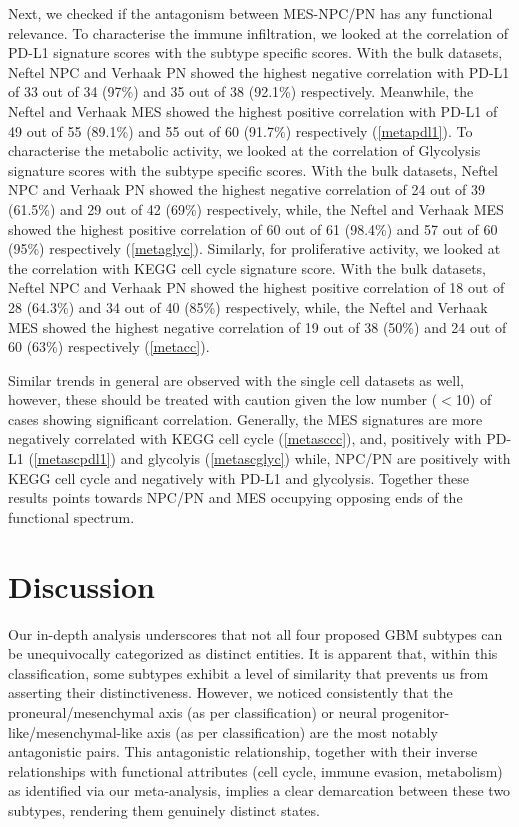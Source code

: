 \documentclass[11pt,a4paper]{article}
\begin{document}
Next, we checked if the antagonism between MES-NPC/PN has any functional relevance. To characterise the immune infiltration, we looked at the correlation of PD-L1 signature scores with the subtype specific scores. With the bulk datasets, Neftel NPC and Verhaak PN showed the highest negative correlation with PD-L1 of 33 out of 34 (97\%) and  35 out of 38 (92.1\%) respectively. Meanwhile, the Neftel and Verhaak MES showed the highest positive correlation with PD-L1 of 49 out of 55 (89.1\%) and 55 out of 60 (91.7\%) respectively (\autoref{metapdl1}). To characterise the metabolic activity, we looked at the correlation of Glycolysis signature scores with the subtype specific scores. With the bulk datasets, Neftel NPC and Verhaak PN showed the highest negative correlation of 24 out of 39 (61.5\%) and  29 out of 42 (69\%) respectively, while, the Neftel and Verhaak MES showed the highest positive correlation of 60 out of 61 (98.4\%) and 57 out of 60 (95\%) respectively (\autoref{metaglyc}). Similarly, for proliferative activity, we looked at the correlation with KEGG cell cycle signature score. With the bulk datasets, Neftel NPC and Verhaak PN showed the highest positive correlation of 18 out of 28 (64.3\%) and  34 out of 40 (85\%) respectively, while, the Neftel and Verhaak MES showed the highest negative correlation of 19 out of 38 (50\%) and 24 out of 60 (63\%) respectively (\autoref{metacc}).

Similar trends in general are observed with the single cell datasets as well, however, these should be treated with caution given the low number ($<$10) of cases showing significant correlation. Generally, the MES signatures are more negatively correlated with KEGG cell cycle (\autoref{metasccc}), and, positively with PD-L1 (\autoref{metascpdl1}) and glycolyis (\autoref{metascglyc}) while, NPC/PN are positively with KEGG cell cycle and negatively with PD-L1 and glycolysis. Together these results points towards NPC/PN and MES occupying opposing ends of the functional spectrum.

\section{Discussion}
Our in-depth analysis underscores that not all four proposed GBM subtypes can be unequivocally categorized as distinct entities. It is apparent that, within this classification, some subtypes exhibit a level of similarity that prevents us from asserting their distinctiveness. However, we noticed consistently that the proneural/mesenchymal axis (as per \cite{Verhaak} classification) or neural progenitor-like/mesenchymal-like axis (as per \cite{Neftel} classification) are the most notably antagonistic pairs. This antagonistic relationship, together with their inverse relationships with functional attributes (cell cycle, immune evasion, metabolism) as identified via our meta-analysis, implies a clear demarcation between these two subtypes, rendering them genuinely distinct states.
\end{document}
